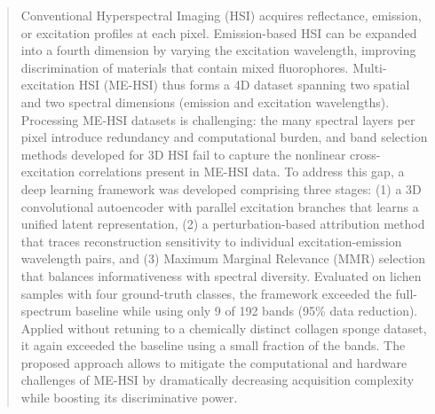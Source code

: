 \begin{abstract}
Conventional Hyperspectral Imaging (HSI) acquires reflectance, emission, or excitation profiles at each pixel.
Emission-based HSI can be expanded into a fourth dimension by varying the excitation wavelength, improving discrimination of materials that contain mixed fluorophores.
Multi-excitation HSI (ME-HSI) thus forms a 4D dataset spanning two spatial and two spectral dimensions (emission and excitation wavelengths).
Processing ME-HSI datasets is challenging: the many spectral layers per pixel introduce redundancy and computational burden, and band selection methods developed for 3D HSI fail to capture the nonlinear cross-excitation correlations present in ME-HSI data.
To address this gap, a deep learning framework was developed comprising three stages: (1) a 3D convolutional autoencoder with parallel excitation branches that learns a unified latent representation, (2) a perturbation-based attribution method that traces reconstruction sensitivity to individual excitation-emission wavelength pairs, and (3) Maximum Marginal Relevance (MMR) selection that balances informativeness with spectral diversity.
Evaluated on lichen samples with four ground-truth classes, the framework exceeded the full-spectrum baseline while using only 9 of 192 bands (95\% data reduction).
Applied without retuning to a chemically distinct collagen sponge dataset, it again exceeded the baseline using a small fraction of the bands.
The proposed approach allows to mitigate the computational and hardware challenges of ME-HSI by dramatically decreasing acquisition complexity while boosting its discriminative power.
\end{abstract}